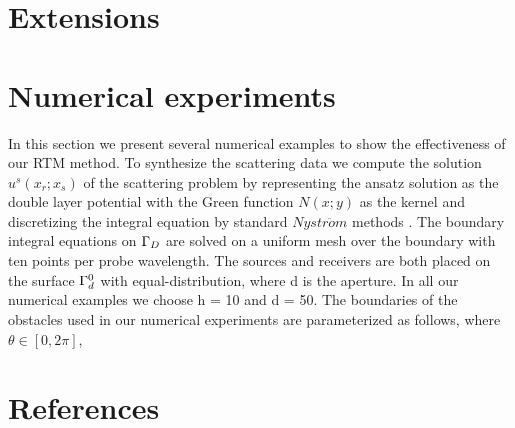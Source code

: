 \documentclass[12pt]{iopart}
\begin{document}
\section{Extensions}
\section{Numerical experiments}
In this section we present several numerical examples to show the effectiveness of our
RTM method. To synthesize the scattering data we compute the solution $u^s(x_r; x_s)$ of
the scattering problem by representing the ansatz solution as the double layer potential
with the Green function $N(x; y)$ as the kernel and discretizing the integral equation by
standard $Nystr\ddot{o}m$ methods \cite{colton-kress}. The boundary integral equations on $\Gamma_D$ are solved on
a uniform mesh over the boundary with ten points per probe wavelength. The sources
and receivers are both placed on the surface $\Gamma_d^0$ with equal-distribution, where d is the
aperture. In all our numerical examples we choose h = 10 and d = 50. The boundaries
of the obstacles used in our numerical experiments are parameterized as follows, where
$\theta\in[0,2\pi]$,
\section*{References}

\end{document}
